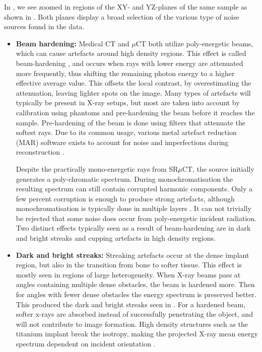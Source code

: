 In , we see zoomed in regions of the XY- and YZ-planes of the same sample as shown
in .  Both planes display a broad selection of the various type of noise
sources found in the data.
\begin{itemize}
\item \textbf{Beam hardening:} Medical CT and $\mu$CT both utilize poly-energetic beams, which can cause artefacts around high
density regions. This effect is called beam-hardening \citep{beam-hardening}, and occurs when rays
with lower energy are attenuated more frequently, thus shifting the remaining photon energy to a
higher effective average value. This offsets the local contrast, by overestimating the attenuation,
leaving lighter spots on the image. Many types of artefacts will typically be present in X-ray 
setups, but most are taken into account by calibration using phantoms and pre-hardening the beam
before it reaches the sample. Pre-hardening of the beam is done using filters that attenuate the
softest rays. Due to its common usage, various metal artefact reduction (MAR) software exists to
account for noise and imperfections during reconstruction \citep{mar1}\citep{mar2}.

Despite the practically mono-energetic rays from SR$\mu$CT, the source initially generates a
poly-chromatic spectrum. During monochromatisation the resulting spectrum can still contain
corrupted harmonic components. Only a few percent corruption is enough to produce strong artefacts,
although monochromatisation is typically done in multiple layers \citep{srnoise}.  It can not
trivially be rejected that some noise does occur from poly-energetic incident radiation.  Two
distinct effects typically seen as a result of beam-hardening are in dark and bright streaks and
cupping artefacts in high density regions.

\item \textbf{Dark and bright streaks:} Streaking artefacts occur at the dense implant region, but also
in the transition from bone to softer tissue. This effect is mostly seen in regions of large
heterogeneity. When X-ray beams pass at angles containing multiple dense obstacles, the beam is
hardened more. Then for angles with fewer dense obstacles the energy spectrum is preserved better.
This produced the dark and bright streaks seen in .
%
For a hardened beam, softer x-rays are absorbed instead of successfully penetrating the object, and
will not contribute to image formation. High density structures such as the titanium implant break
the isotropy, making the projected X-ray mean energy spectrum dependent on incident orientation
\citep{srnoise}.


\end{itemize}
